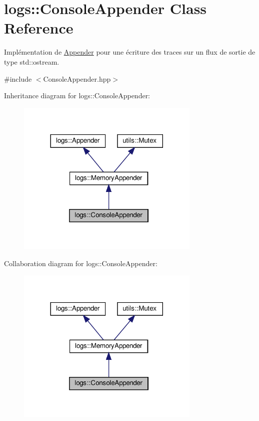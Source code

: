 \hypertarget{classlogs_1_1ConsoleAppender}{}\section{logs\+:\+:Console\+Appender Class Reference}
\label{classlogs_1_1ConsoleAppender}


Implémentation de \hyperlink{classlogs_1_1Appender}{Appender} pour une écriture des traces sur un flux de sortie de type std\+::ostream.  




{\ttfamily \#include $<$Console\+Appender.\+hpp$>$}



Inheritance diagram for logs\+:\+:Console\+Appender\+:
\nopagebreak
\begin{figure}[H]
\begin{center}
\leavevmode
\includegraphics[width=248pt]{classlogs_1_1ConsoleAppender__inherit__graph}
\end{center}
\end{figure}


Collaboration diagram for logs\+:\+:Console\+Appender\+:
\nopagebreak
\begin{figure}[H]
\begin{center}
\leavevmode
\includegraphics[width=248pt]{classlogs_1_1ConsoleAppender__coll__graph}
\end{center}
\end{figure}
